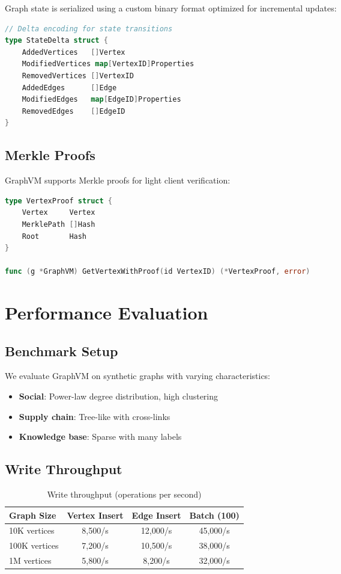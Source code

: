 \documentclass[11pt,a4paper]{article}
\theoremstyle{definition}
\begin{document}
Graph state is serialized using a custom binary format optimized for incremental updates:

\begin{lstlisting}[language=Go]
// Delta encoding for state transitions
type StateDelta struct {
    AddedVertices   []Vertex
    ModifiedVertices map[VertexID]Properties
    RemovedVertices []VertexID
    AddedEdges      []Edge
    ModifiedEdges   map[EdgeID]Properties
    RemovedEdges    []EdgeID
}
\end{lstlisting}

\subsection{Merkle Proofs}

GraphVM supports Merkle proofs for light client verification:

\begin{lstlisting}[language=Go]
type VertexProof struct {
    Vertex     Vertex
    MerklePath []Hash
    Root       Hash
}

func (g *GraphVM) GetVertexWithProof(id VertexID) (*VertexProof, error)
\end{lstlisting}

\section{Performance Evaluation}

\subsection{Benchmark Setup}

We evaluate GraphVM on synthetic graphs with varying characteristics:
\begin{itemize}
    \item \textbf{Social}: Power-law degree distribution, high clustering
    \item \textbf{Supply chain}: Tree-like with cross-links
    \item \textbf{Knowledge base}: Sparse with many labels
\end{itemize}

\subsection{Write Throughput}

\begin{table}[h]
\centering
\begin{tabular}{@{}lccc@{}}
\toprule
Graph Size & Vertex Insert & Edge Insert & Batch (100) \\
\midrule
10K vertices & 8,500/s & 12,000/s & 45,000/s \\
100K vertices & 7,200/s & 10,500/s & 38,000/s \\
1M vertices & 5,800/s & 8,200/s & 32,000/s \\
\bottomrule
\end{tabular}
\caption{Write throughput (operations per second)}
\end{table}
\end{document}
